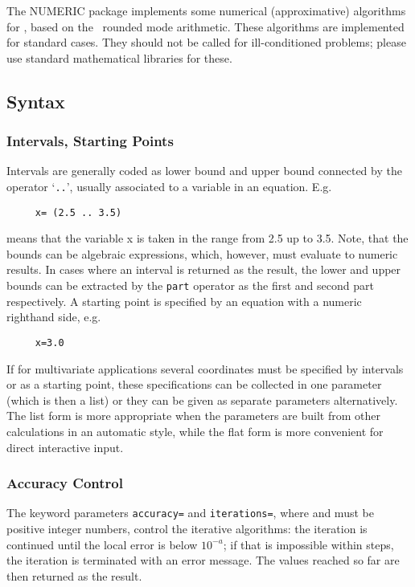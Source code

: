 The \textsc{NUMERIC} package implements some numerical (approximative)
algorithms for \REDUCE, based on the \REDUCE\ rounded mode
arithmetic. These algorithms are implemented for standard cases.
They should not be called for ill-conditioned problems;
please use standard mathematical libraries for these.

\subsection{Syntax}

\subsubsection{Intervals, Starting Points}

Intervals are generally coded as lower bound and
upper bound connected by the operator `\texttt{..}', usually
associated to a variable in an
equation. E.g.
\begin{verbatim}
     x= (2.5 .. 3.5)
\end{verbatim}
means that the variable x is taken in the range from 2.5 up to
3.5. Note, that the bounds can be algebraic
expressions, which, however, must evaluate to numeric results.
In cases where an interval is returned as the result, the lower
and upper bounds can be extracted by the \texttt{part} operator
as the first and second part respectively.
A starting point is specified by an equation with a numeric
righthand side, e.g.
\begin{verbatim}
     x=3.0
\end{verbatim}
If for multivariate applications several coordinates must be
specified by intervals or as a starting point, these
specifications can be collected in one parameter (which is then
a list) or they can be given as separate parameters
alternatively. The list form is more appropriate when the
parameters are built from other \REDUCE{} calculations in an
automatic style, while the flat form is more convenient
for direct interactive input.

\subsubsection{Accuracy Control}

The keyword parameters \texttt{accuracy=} and \texttt{iterations=}, where
 and  must be positive integer numbers, control the
iterative algorithms: the iteration is continued until
the local error is below $10^{-a}$; if that is impossible
within  steps, the iteration is terminated with an
error message. The values reached so far are then returned
as the result.

